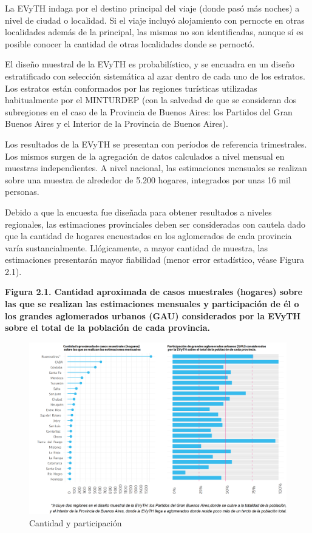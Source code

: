 \documentclass[
  openany]{book}
\begin{document}
La EVyTH indaga por el destino principal del viaje (donde pasó más noches) a nivel de ciudad o localidad.
Si el viaje incluyó alojamiento con pernocte en otras localidades además de la principal, las mismas no son identificadas, aunque sí es posible conocer la cantidad de otras localidades donde se pernoctó.

El diseño muestral de la EVyTH es probabilístico, y se encuadra en un diseño estratificado con selección sistemática al azar dentro de cada uno de los estratos.
Los estratos están conformados por las regiones turísticas utilizadas habitualmente por el MINTURDEP (con la salvedad de que se consideran dos subregiones en el caso de la Provincia de Buenos Aires: los Partidos del Gran Buenos Aires y el Interior de la Provincia de Buenos Aires).

Los resultados de la EVyTH se presentan con períodos de referencia trimestrales.
Los mismos surgen de la agregación de datos calculados a nivel mensual en muestras independientes.
A nivel nacional, las estimaciones mensuales se realizan sobre una muestra de alrededor de 5.200 hogares, integrados por unas 16 mil personas.

Debido a que la encuesta fue diseñada para obtener resultados a niveles regionales, las estimaciones provinciales deben ser consideradas con cautela dado que la cantidad de hogares encuestados en los aglomerados de cada provincia varía sustancialmente.
Llógicamente, a mayor cantidad de muestra, las estimaciones presentarán mayor fiabilidad (menor error estadístico, véase Figura 2.1).

\textbf{Figura 2.1. Cantidad aproximada de casos muestrales (hogares) sobre las que se realizan las estimaciones mensuales y participación de él o los grandes aglomerados urbanos (GAU) considerados por la EVyTH sobre el total de la población de cada provincia.}

\begin{figure}

{\centering \includegraphics[width=0.8\linewidth]{imagenes/figura2.1} 

}

\caption{Cantidad y participación}\label{fig:cantidades}
\end{figure}
\end{document}

